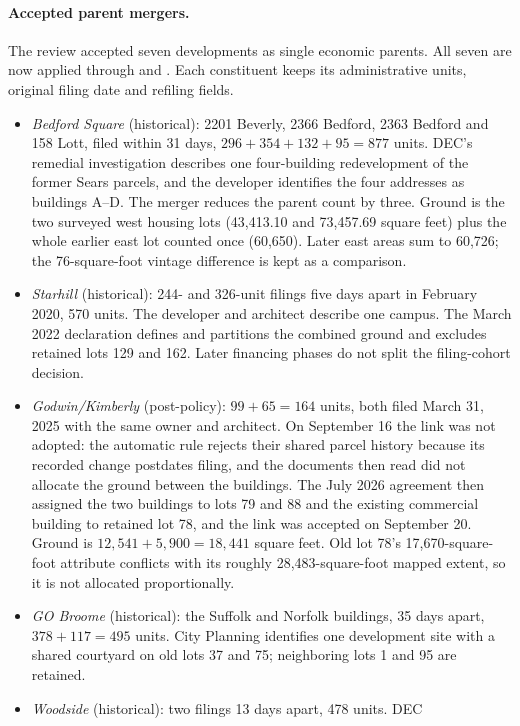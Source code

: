 \paragraph{Accepted parent mergers.}
The review accepted seven developments as single economic parents. All seven
are now applied through  and
. Each constituent keeps its administrative units,
original filing date and refiling fields.
\begin{itemize}
\item \textit{Bedford Square} (historical): 2201 Beverly, 2366 Bedford, 2363
Bedford and 158 Lott, filed within 31 days, $296+354+132+95=877$ units. DEC's
remedial investigation describes one four-building redevelopment of the
former Sears parcels, and the developer identifies the four addresses as
buildings A--D. The merger reduces the parent count by three. Ground is the
two surveyed west housing lots (43,413.10 and 73,457.69 square feet) plus the
whole earlier east lot counted once (60,650). Later east areas sum to 60,726;
the 76-square-foot vintage difference is kept as a comparison.
\item \textit{Starhill} (historical): 244- and 326-unit filings five days apart
in February 2020, 570 units. The developer and architect describe one campus.
The March 2022 declaration defines and partitions the combined ground and
excludes retained lots 129 and 162. Later financing phases do not split the
filing-cohort decision.
\item \textit{Godwin/Kimberly} (post-policy): $99+65=164$ units, both filed
March 31, 2025 with the same owner and architect. On September 16 the link was
not adopted: the automatic rule rejects their shared parcel history because
its recorded change postdates filing, and the documents then read did not
allocate the ground between the buildings. The July 2026 agreement then assigned the two buildings to lots 79 and
88 and the existing commercial building to retained lot 78, and the link was
accepted on September 20. Ground is $12,541+5,900=18,441$ square feet. Old lot
78's 17,670-square-foot attribute conflicts with its roughly
28,483-square-foot mapped extent, so it is not allocated proportionally.
\item \textit{GO Broome} (historical): the Suffolk and Norfolk buildings, 35 days
apart, $378+117=495$ units. City Planning identifies one development site with a
shared courtyard on old lots 37 and 75; neighboring lots 1 and 95 are retained.
\item \textit{Woodside} (historical): two filings 13 days apart, 478 units. DEC

\end{itemize}
